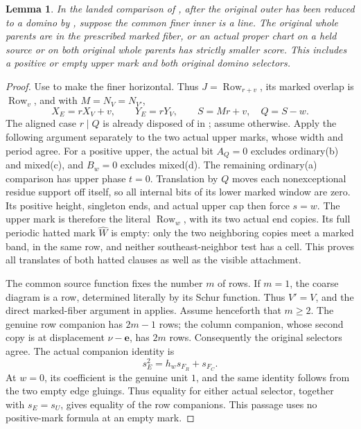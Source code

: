 \documentclass[11pt,a4paper]{amsart}
\numberwithin{equation}{section}
\theoremstyle{plain}
\newtheorem{lemma}[theorem]{Lemma}
\theoremstyle{definition}
\newcommand{\Row}{\operatorname{Row}}
\begin{document}
\begin{lemma}\label{rt:line-finer}
In the landed comparison of , after the original
outer has been reduced to a domino by , suppose the
common finer inner is a line.  The original whole parents are in the
prescribed marked fiber, or an actual proper chart on a held source or
on both original whole parents has strictly smaller score.  This
includes a positive or empty upper mark and both original domino selectors.
\end{lemma}
\begin{proof}
Use  to make the finer horizontal.  Thus
\(J=\Row_{r+v}\), its marked overlap is \(\Row_v\), and
with \(M=N_V=N_{V'}\),
\[
 X_E=rX_V+v,\qquad Y_E=rY_V,
 \qquad S=Mr+v,\quad Q=S-w.
\]
The aligned case \(r\mid Q\) is already disposed of in
; assume otherwise.  Apply the following argument
separately to the two actual upper marks, whose width and period agree.
For a positive upper, the
actual bit \(A_Q=0\) excludes ordinary(b) and mixed(c), and
\(B_w=0\) excludes mixed(d).  The remaining ordinary(a) comparison has
upper phase \(t=0\).  Translation by \(Q\) moves each nonexceptional
residue support off itself, so all internal bits of its lower marked
window are zero.  Its positive height, singleton ends, and actual upper
cap then force \(s=w\).  The upper mark is therefore the literal
\(\Row_w\), with its two actual end copies.  Its full periodic hatted
mark \(\widehat W\) is empty:
only the two neighboring copies meet a marked band, in the same row, and
neither southeast-neighbor test has a cell.  This proves all translates
of both hatted clauses as well as the visible attachment.

The common source function fixes the number \(m\) of rows.  If \(m=1\),
the coarse diagram is a row, determined literally by its Schur function.
Thus \(V'=V\), and the direct marked-fiber argument in
 applies.  Assume henceforth that \(m\ge2\).
The genuine
row companion has \(2m-1\) rows; the column companion, whose second copy
is at displacement \(\nu-\mathbf e\), has \(2m\) rows.
Consequently the original selectors agree.  The actual companion
identity is
\begin{equation}\label{rt:line-companion}
 s_E^2=h_w s_{F_R}+s_{F_C}.
\end{equation}
At \(w=0\), its coefficient is the genuine unit \(1\), and the same
identity follows from the two empty edge gluings.  Thus equality for
either actual selector, together with \(s_E=s_U\), gives equality of
the row companions.  This passage uses no positive-mark formula at an
empty mark.


\end{proof}
\end{document}
